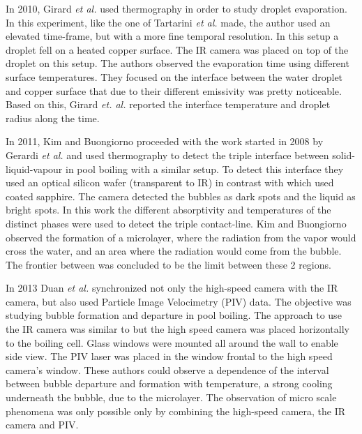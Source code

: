 \par In 2010, Girard \textit{et al.} \cite{girard2010infrared} used thermography in order to study droplet evaporation. In this experiment, like the one of Tartarini \textit{et al.} made, the author used an elevated time-frame, but with a more fine temporal resolution. In this setup a droplet fell on a heated copper surface. The IR camera was placed on top of the droplet on this setup. The authors observed the evaporation time using different surface temperatures. They focused on the interface between the water droplet and copper surface that due to their different emissivity was pretty noticeable. Based on this, Girard \textit{et. al.} reported the interface temperature and droplet radius along the time. \\

\par In 2011, Kim and Buongiorno \cite{kim2011detection} proceeded with the work started in 2008 by Gerardi \textit{et al.} and used thermography to detect the triple interface between solid-liquid-vapour in pool boiling with a similar setup. To detect this interface they used an optical silicon wafer (transparent to IR) in contrast with \cite{Gerardi2008} which used coated sapphire. The camera detected the bubbles as dark spots and the liquid as bright spots. In this work the different absorptivity and temperatures of the distinct phases were used to detect the triple contact-line. Kim and Buongiorno observed the formation of a microlayer, where the radiation from the vapor would cross the water, and an area where the radiation would come from the bubble. The frontier between was concluded to be the limit between these 2 regions. \\

\par In 2013 Duan \textit{et al.} \cite{duan2013synchronized} synchronized not only the high-speed camera with the IR camera, but also used Particle Image Velocimetry (PIV) data. The objective was studying bubble formation and departure in pool boiling. The approach to use the IR camera was similar to \cite{Gerardi2008} but the high speed camera was placed horizontally to the boiling cell. Glass windows were mounted all around the wall to enable side view. The PIV laser was placed in the window frontal to the high speed camera's window. These authors could observe a dependence of the interval between bubble departure and formation with temperature, a strong cooling underneath the bubble, due to the microlayer. The observation of micro scale phenomena was only possible only by combining the high-speed camera, the IR camera and PIV. \\

